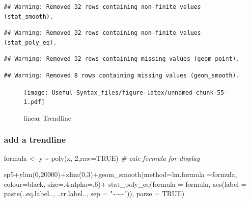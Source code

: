 \documentclass[
]{article}
\newenvironment{Shaded}{\begin{snugshade}}{\end{snugshade}}
\newcommand{\AttributeTok}[1]{\textcolor[rgb]{0.77,0.63,0.00}{#1}}
\newcommand{\CommentTok}[1]{\textcolor[rgb]{0.56,0.35,0.01}{\textit{#1}}}
\newcommand{\ConstantTok}[1]{\textcolor[rgb]{0.00,0.00,0.00}{#1}}
\newcommand{\DecValTok}[1]{\textcolor[rgb]{0.00,0.00,0.81}{#1}}
\newcommand{\FunctionTok}[1]{\textcolor[rgb]{0.00,0.00,0.00}{#1}}
\newcommand{\NormalTok}[1]{#1}
\newcommand{\OtherTok}[1]{\textcolor[rgb]{0.56,0.35,0.01}{#1}}
\newcommand{\SpecialCharTok}[1]{\textcolor[rgb]{0.00,0.00,0.00}{#1}}
\newcommand{\StringTok}[1]{\textcolor[rgb]{0.31,0.60,0.02}{#1}}
\begin{document}
\begin{verbatim}
## Warning: Removed 32 rows containing non-finite values (stat_smooth).
\end{verbatim}

\begin{verbatim}
## Warning: Removed 32 rows containing non-finite values (stat_poly_eq).
\end{verbatim}

\begin{verbatim}
## Warning: Removed 32 rows containing missing values (geom_point).
\end{verbatim}

\begin{verbatim}
## Warning: Removed 8 rows containing missing values (geom_smooth).
\end{verbatim}

\begin{figure}
\centering
\texttt{[image: Useful-Syntax\_files/figure-latex/unnamed-chunk-55-1.pdf]}
\caption{\label{fig:unnamed-chunk-55}linear Trendline}
\end{figure}

\hypertarget{add-a-trendline-1}{%
\subsubsection{add a trendline}\label{add-a-trendline-1}}

\begin{Shaded}
\begin{Highlighting}[]
\NormalTok{formula }\OtherTok{\textless{}{-}}\NormalTok{ y }\SpecialCharTok{\textasciitilde{}} \FunctionTok{poly}\NormalTok{(x, }\DecValTok{2}\NormalTok{,}\AttributeTok{raw=}\ConstantTok{TRUE}\NormalTok{) }\CommentTok{\# calc formula for display}

\NormalTok{sp5}\SpecialCharTok{+}\FunctionTok{ylim}\NormalTok{(}\DecValTok{0}\NormalTok{,}\DecValTok{20000}\NormalTok{)}\SpecialCharTok{+}\FunctionTok{xlim}\NormalTok{(}\DecValTok{0}\NormalTok{,}\DecValTok{3}\NormalTok{)}\SpecialCharTok{+}\FunctionTok{geom\_smooth}\NormalTok{(}\AttributeTok{method=}\StringTok{\textquotesingle{}lm\textquotesingle{}}\NormalTok{,}\AttributeTok{formula =}\NormalTok{formula,}
                                        \AttributeTok{colour=}\StringTok{\textquotesingle{}black\textquotesingle{}}\NormalTok{, }\AttributeTok{size=}\NormalTok{.}\DecValTok{4}\NormalTok{,}\AttributeTok{alpha=}\NormalTok{.}\DecValTok{6}\NormalTok{)}\SpecialCharTok{+}
  \FunctionTok{stat\_poly\_eq}\NormalTok{(}\AttributeTok{formula =}\NormalTok{ formula,}
               \FunctionTok{aes}\NormalTok{(}\AttributeTok{label =} \FunctionTok{paste}\NormalTok{(..eq.label.., ..rr.label..,}
                                                        \AttributeTok{sep =} \StringTok{"\textasciitilde{}\textasciitilde{}\textasciitilde{}"}\NormalTok{)), }\AttributeTok{parse =} \ConstantTok{TRUE}\NormalTok{)}
\end{Highlighting}
\end{Shaded}
\end{document}
